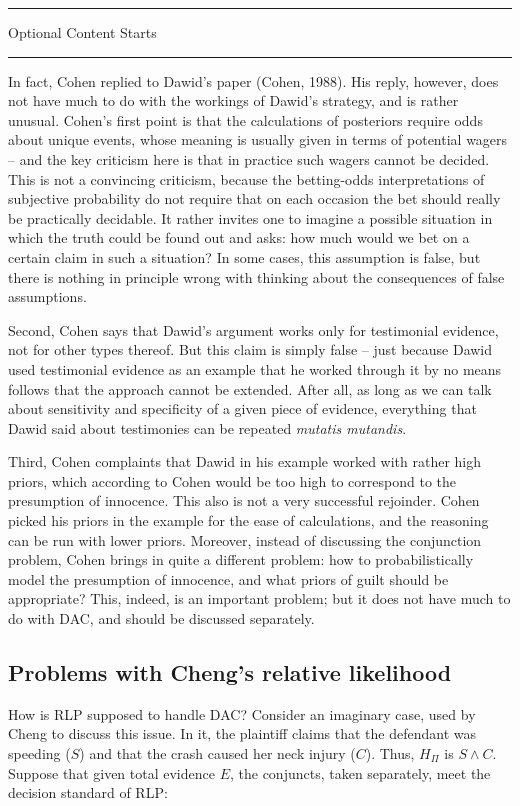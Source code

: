 \documentclass[10pt,dvipsnames,enabledeprecatedfontcommands]{scrartcl}
\newcommand{\et}{\wedge}
\newcommand{\intermezzoa}{
	\begin{minipage}[c]{13cm}
	\begin{center}\rule{10cm}{0.4pt}



	\tiny{\sc Optional Content Starts}
	
	\vspace{-1mm}
	
	\rule{10cm}{0.4pt}\end{center}
	\end{minipage}\nopagebreak 
	}
\begin{document}
\intermezzoa

In fact, Cohen replied to Dawid's paper (Cohen, 1988). His reply,
however, does not have much to do with the workings of Dawid's strategy,
and is rather unusual. Cohen's first point is that the calculations of
posteriors require odds about unique events, whose meaning is usually
given in terms of potential wagers -- and the key criticism here is that
in practice such wagers cannot be decided. This is not a convincing
criticism, because the betting-odds interpretations of subjective
probability do not require that on each occasion the bet should really
be practically decidable. It rather invites one to imagine a possible
situation in which the truth could be found out and asks: how much would
we bet on a certain claim in such a situation? In some cases, this
assumption is false, but there is nothing in principle wrong with
thinking about the consequences of false assumptions.

Second, Cohen says that Dawid's argument works only for testimonial
evidence, not for other types thereof. But this claim is simply false --
just because Dawid used testimonial evidence as an example that he
worked through it by no means follows that the approach cannot be
extended. After all, as long as we can talk about sensitivity and
specificity of a given piece of evidence, everything that Dawid said
about testimonies can be repeated \emph{mutatis mutandis}.

Third, Cohen complaints that Dawid in his example worked with rather
high priors, which according to Cohen would be too high to correspond to
the presumption of innocence. This also is not a very successful
rejoinder. Cohen picked his priors in the example for the ease of
calculations, and the reasoning can be run with lower priors. Moreover,
instead of discussing the conjunction problem, Cohen brings in quite a
different problem: how to probabilistically model the presumption of
innocence, and what priors of guilt should be appropriate? This, indeed,
is an important problem; but it does not have much to do with DAC, and
should be discussed separately.

\subsection{Problems with Cheng's relative
likelihood}\label{problems-with-chengs-relative-likelihood}

How is RLP supposed to handle DAC? Consider an imaginary case, used by
Cheng to discuss this issue. In it, the plaintiff claims that the
defendant was speeding (\(S\)) and that the crash caused her neck injury
(\(C\)). Thus, \(H_\Pi\) is \(S\et C\). Suppose that given total
evidence \(E\), the conjuncts, taken separately, meet the decision
standard of RLP:
\end{document}
